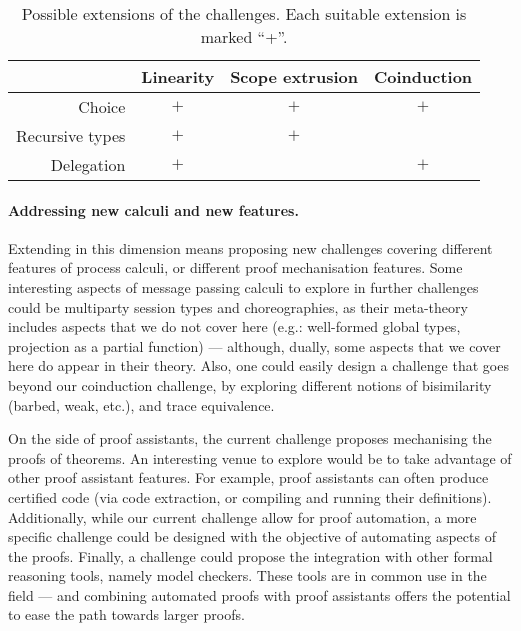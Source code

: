\documentclass[runningheads]{llncs}
\begin{document}
\begin{table}[btp]
  \caption{Possible extensions of the challenges. Each suitable extension is marked ``+''. \label{tab:extensions}}
  \begin{center}\small
    \vspace{-4mm}%
    \begin{tabular}{|r|c|c|c|}
      \hline
      & Linearity & Scope extrusion & Coinduction \\
      \hline
      Choice & $+$ & $+$  & $+$ \\
      \hline
      Recursive types & $+$  & $+$ & \\
      \hline
      Delegation & $+$ & & $+$ \\
      \hline
    \end{tabular}
    \vspace{-3mm}%
  \end{center}
\end{table}

\vspace{-1mm}%
\paragraph{Addressing new calculi and new features.}
Extending in this dimension
means proposing new challenges covering different features of
process calculi, or different proof mechanisation features.
Some interesting aspects of message passing calculi to explore in
further challenges could be multiparty session types and
choreographies, as their meta-theory includes aspects
that we do not cover here (e.g.: well-formed global types,
projection as a partial function) --- although, dually, some aspects
that we cover here do appear in their theory. Also, one could easily
design a challenge that goes beyond our coinduction challenge, by
exploring different notions of bisimilarity (barbed, weak, etc.),
and trace equivalence.

On the side of proof assistants, the current challenge proposes mechanising the
proofs of theorems. An interesting venue to explore would be to take advantage
of other proof assistant features. For example, proof assistants can often
produce certified code (via code extraction, or compiling and running their
definitions). Additionally, while our current challenge allow for proof
automation, a more specific challenge could be designed with the objective of
automating aspects of the proofs. Finally, a challenge could propose the
integration with other formal reasoning tools, namely model checkers. These
tools are in common use in the field --- and combining automated proofs with
proof assistants offers the potential to ease the path towards larger proofs.
\end{document}
